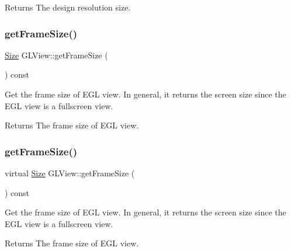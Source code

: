 \begin{DoxyReturn}{Returns}
The design resolution size. 
\end{DoxyReturn}
\mbox{\label{classGLView_aadfda5aa1419ab211b4a18b12c34af3c}} 
\subsubsection{\texorpdfstring{get\+Frame\+Size()}{getFrameSize()}\hspace{0.1cm}{\footnotesize\ttfamily [1/2]}}
{\footnotesize\ttfamily \hyperlink{classSize}{Size} G\+L\+View\+::get\+Frame\+Size (\begin{DoxyParamCaption}{ }\end{DoxyParamCaption}) const\hspace{0.3cm}{\ttfamily [virtual]}}

Get the frame size of E\+GL view. In general, it returns the screen size since the E\+GL view is a fullscreen view.

\begin{DoxyReturn}{Returns}
The frame size of E\+GL view. 
\end{DoxyReturn}
\mbox{\label{classGLView_a799a1769901a6bbd707457746e8d3763}} 
\subsubsection{\texorpdfstring{get\+Frame\+Size()}{getFrameSize()}\hspace{0.1cm}{\footnotesize\ttfamily [2/2]}}
{\footnotesize\ttfamily virtual \hyperlink{classSize}{Size} G\+L\+View\+::get\+Frame\+Size (\begin{DoxyParamCaption}{ }\end{DoxyParamCaption}) const\hspace{0.3cm}{\ttfamily [virtual]}}

Get the frame size of E\+GL view. In general, it returns the screen size since the E\+GL view is a fullscreen view.

\begin{DoxyReturn}{Returns}
The frame size of E\+GL view. 
\end{DoxyReturn}
\mbox{\label{classGLView_ab804d7568f68b8d91cf420d1c0057f38}} 
